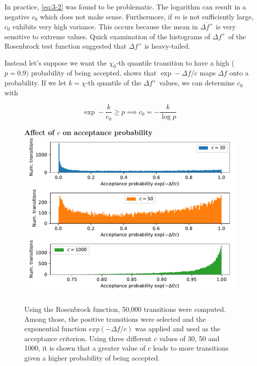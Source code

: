 In practice, \cref{eq:3-2} was found to be problematic. The logarithm can result in a negative $c_0$ which does not make sense.
Furthermore, if $m$ is not sufficiently large, $c_0$ exhibits very high variance. This occurs because the mean in 
$\overline{\Delta f^+}$ is very sensitive to extreme values. Quick examination of the histograms of $\Delta f^+$ of the Rosenbrock
test function suggested that $\Delta f^+$ is heavy-tailed.

Instead let's suppose we want the $\chi_0$-th quantile transition to have a high ($p=0.9)$ probability of being accepted. 
 shows that $\exp -\Delta f / c$ maps $\Delta f$ onto a probability. If we let $k=\chi$-th quantile of the
$\Delta f^+$ values, we can determine $c_0$ with


\begin{equation}
    \label{eq:schedule_init}
    \exp - \frac{k}{c_0} \geq p \implies c_0 = -\frac{k}{\log p}
\end{equation}

\begin{figure}
    \centering
    \textbf{Affect of $c$ on acceptance probability}
    \includegraphics[scale=0.5]{figures/fig33.pdf}
    \label{fig:acceptance}
    
  \caption{Using the Rosenbrock function, 50,000 transitions were computed. Among those, the positive transitions were selected and the exponential function $exp(-\Delta f/c)$  was applied and used as the acceptance criterion. Using three different $c$ values of 30, 50 and 1000, it is shown that a greater value of $c$ leads to more transitions given a higher probability of being accepted.}
\end{figure}

